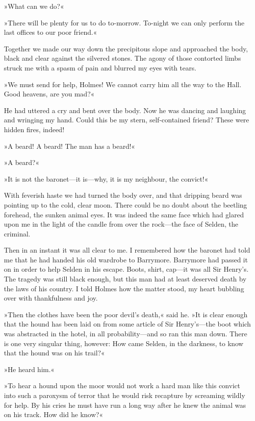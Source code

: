 »What can we do?«

»There will be plenty for us to do to-morrow. To-night we can only perform the last offices to our poor friend.«

Together we made our way down the precipitous slope and approached the body, black and clear against the silvered stones. The agony of those contorted limbs struck me with a spasm of pain and blurred my eyes with tears.

»We must send for help, Holmes! We cannot carry him all the way to the Hall. Good heavens, are you mad?«

He had uttered a cry and bent over the body. Now he was dancing and laughing and wringing my hand. Could this be my stern, self-contained friend? These were hidden fires, indeed!

»A beard! A beard! The man has a beard!«

»A beard?«

»It is not the baronet—it is—why, it is my neighbour, the convict!«

With feverish haste we had turned the body over, and that dripping beard was pointing up to the cold, clear moon. There could be no doubt about the beetling forehead, the sunken animal eyes. It was indeed the same face which had glared upon me in the light of the candle from over the rock—the face of Selden, the criminal.

Then in an instant it was all clear to me. I remembered how the baronet had told me that he had handed his old wardrobe to Barrymore. Barrymore had passed it on in order to help Selden in his escape. Boots, shirt, cap—it was all Sir Henry's. The tragedy was still black enough, but this man had at least deserved death by the laws of his country. I told Holmes how the matter stood, my heart bubbling over with thankfulness and joy.

»Then the clothes have been the poor devil's death,« said he. »It is clear enough that the hound has been laid on from some article of Sir Henry's—the boot which was abstracted in the hotel, in all probability—and so ran this man down. There is one very singular thing, however: How came Selden, in the darkness, to know that the hound was on his trail?«

»He heard him.«

»To hear a hound upon the moor would not work a hard man like this convict into such a paroxysm of terror that he would risk recapture by screaming wildly for help. By his cries he must have run a long way after he knew the animal was on his track. How did he know?«

